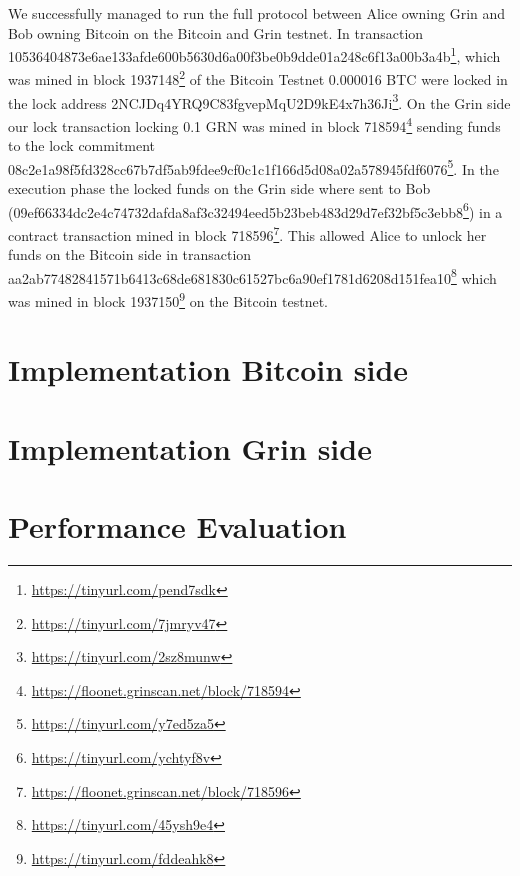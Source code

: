 We successfully managed to run the full protocol between Alice owning Grin and Bob owning Bitcoin on the Bitcoin and Grin testnet.
In transaction \\10536404873e6ae133afde600b5630d6a00f3be0b9dde01a248c6f13a00b3a4b\footnote{\url{https://tinyurl.com/pend7sdk}}, which was mined in block 1937148\footnote{\url{https://tinyurl.com/7jmryv47}} of the Bitcoin Testnet 0.000016 BTC were locked in the lock address 2NCJDq4YRQ9C83fgvepMqU2D9kE4x7h36Ji\footnote{\url{https://tinyurl.com/2sz8munw}}.
On the Grin side our lock transaction locking 0.1 GRN was mined in block 718594\footnote{\url{https://floonet.grinscan.net/block/718594}} sending funds to the lock commitment \\08c2e1a98f5fd328cc67b7df5ab9fdee9cf0c1c1f166d5d08a02a578945fdf6076\footnote{\url{https://tinyurl.com/y7ed5za5}}.
In the execution phase the locked funds on the Grin side where sent to Bob \\(09ef66334dc2e4c74732dafda8af3c32494eed5b23beb483d29d7ef32bf5c3ebb8\footnote{\url{https://tinyurl.com/ychtyf8v}}) in a contract transaction mined in block 718596\footnote{\url{https://floonet.grinscan.net/block/718596}}.
This allowed Alice to unlock her funds on the Bitcoin side in transaction \\ aa2ab77482841571b6413c68de681830c61527bc6a90ef1781d6208d151fea10\footnote{\url{https://tinyurl.com/45ysh9e4}} which was mined in block 1937150\footnote{\url{https://tinyurl.com/fddeahk8}} on the Bitcoin testnet.

\section{Implementation Bitcoin side}\label{sec:ImplementationBtc}
\section{Implementation Grin side}\label{sec:ImplementationGrin}
\section{Performance Evaluation}\label{sec:Performance}